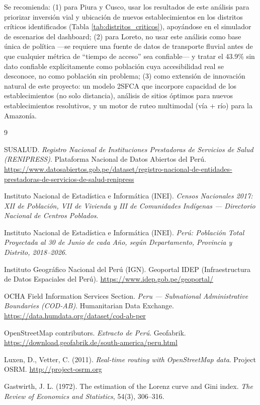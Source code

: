 \documentclass[11pt]{article}
\begin{document}
Se recomienda: (1) para Piura y Cusco, usar los resultados de este
an\'alisis para priorizar inversi\'on vial y ubicaci\'on de nuevos
establecimientos en los distritos cr\'iticos identificados (Tabla
\ref{tab:distritos_criticos}), apoy\'andose en el simulador de escenarios
del dashboard; (2) para Loreto, no usar este an\'alisis como base \'unica
de pol\'itica ---se requiere una fuente de datos de transporte fluvial
antes de que cualquier m\'etrica de ``tiempo de acceso'' sea confiable--- y
tratar el 43.9\% sin dato confiable expl\'icitamente como poblaci\'on cuya
accesibilidad real se desconoce, no como poblaci\'on sin problema; (3)
como extensi\'on de innovaci\'on natural de este proyecto: un modelo 2SFCA
que incorpore capacidad de los establecimientos (no solo distancia),
an\'alisis de sitios \'optimos para nuevos establecimientos resolutivos, y
un motor de ruteo multimodal (v\'ia + r\'io) para la Amazon\'ia.

\begin{thebibliography}{9}

SUSALUD. \emph{Registro Nacional de Instituciones Prestadoras de Servicios
de Salud (RENIPRESS)}. Plataforma Nacional de Datos Abiertos del Per\'u.
\url{https://www.datosabiertos.gob.pe/dataset/registro-nacional-de-entidades-prestadoras-de-servicios-de-salud-renipress}

Instituto Nacional de Estad\'istica e Inform\'atica (INEI). \emph{Censos
Nacionales 2017: XII de Poblaci\'on, VII de Vivienda y III de Comunidades
Ind\'igenas --- Directorio Nacional de Centros Poblados}.

Instituto Nacional de Estad\'istica e Inform\'atica (INEI). \emph{Per\'u:
Poblaci\'on Total Proyectada al 30 de Junio de cada A\~no, seg\'un
Departamento, Provincia y Distrito, 2018--2026}.

Instituto Geogr\'afico Nacional del Per\'u (IGN). Geoportal IDEP
(Infraestructura de Datos Espaciales del Per\'u).
\url{https://www.idep.gob.pe/geoportal/}

OCHA Field Information Services Section. \emph{Peru --- Subnational
Administrative Boundaries (COD-AB)}. Humanitarian Data Exchange.
\url{https://data.humdata.org/dataset/cod-ab-per}

OpenStreetMap contributors. \emph{Extracto de Per\'u}. Geofabrik.
\url{https://download.geofabrik.de/south-america/peru.html}

Luxen, D., Vetter, C. (2011). \emph{Real-time routing with OpenStreetMap
data}. Project OSRM. \url{http://project-osrm.org}

Gastwirth, J. L. (1972). The estimation of the Lorenz curve and Gini
index. \emph{The Review of Economics and Statistics}, 54(3), 306--316.

\end{thebibliography}
\end{document}
